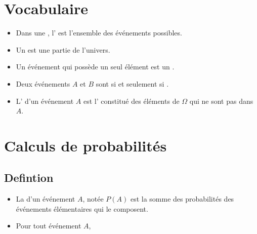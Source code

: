 \documentclass[12pt,a4paper]{article}
\date{}
\title{}
\begin{document}
	
	
	
	
	\section{Vocabulaire}
		
		
		
		\begin{mybilan}
			
		
			\begin{itemize}
				\item Dans une , l' est l'ensemble des événements possibles.
				
				\item Un  est une partie de l'univers.
				
				\item Un événement qui possède un seul élément est un .
				
				\item Deux événements $A$ et $B$ sont  si et seulement si .
				
				\item L' d'un événement $A$ est l' constitué des éléments de $\Omega$ qui ne sont pas dans $A$.
				
			\end{itemize}
		\end{mybilan}	
		

	\section{Calculs de probabilités}

\subsection{Defintion}

\begin{mydef}
	\begin{itemize}
		\item La  d'un événement $A$, notée $P(A)$ est la somme des probabilités des événements élémentaires qui le composent.
		\item Pour tout événement $A$, 
	\end{itemize}
	
\end{mydef}
\end{document}
